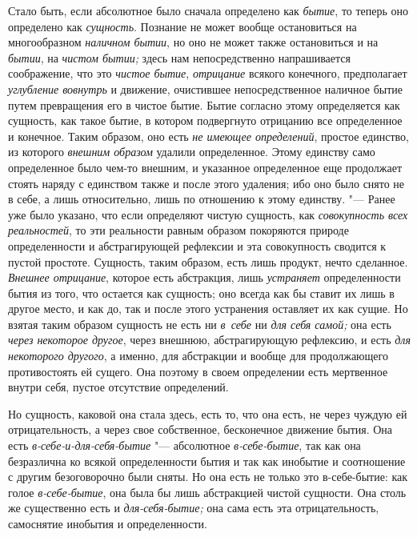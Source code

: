 Стало быть, если абсолютное было сначала определено как
{\em бытие}, то теперь оно определено как
{\em сущность}. Познание не может вообще остановиться
на многообразном {\em наличном бытии}, но оно не может
также остановиться и на {\em бытии}, на
{\em чистом бытии;} здесь нам непосредственно
напрашивается соображение, что это {\em чистое бытие},
{\em отрицание} всякого конечного, предполагает
{\em углубление вовнутрь} и движение, очистившее
непосредственное наличное бытие путем превращения его в чистое бытие. Бытие
согласно этому определяется как сущность, как такое бытие, в котором
подвергнуто отрицанию все определенное и конечное. Таким образом, оно есть
{\em не имеющее определений}, простое единство, из
которого {\em внешним образом} удалили определенное.
Этому единству само определенное было чем-то внешним, и указанное
определенное еще продолжает стоять наряду с единством также и после этого
удаления; ибо оно было снято не в себе, а лишь относительно, лишь по
отношению к этому единству. "--- Ранее
уже было указано, что если определяют чистую сущность, как
{\em совокупность всех реальностей}, то эти реальности
равным образом покоряются природе определенности и абстрагирующей рефлексии
и эта совокупность сводится к пустой простоте. Сущность, таким образом,
есть лишь продукт, нечто сделанное. {\em Внешнее
отрицание}, которое есть абстракция, лишь
{\em устраняет} определенности бытия из того, что
остается как сущность; оно
всегда как бы ставит их лишь в другое место, и как до, так и после этого
устранения оставляет их как сущие. Но взятая таким образом сущность не есть
ни {\em в~себе} ни {\em для себя самой;} она есть {\em через некоторое другое},
через внешнюю, абстрагирующую рефлексию, и есть {\em для
некоторого другого}, а именно, для абстракции и вообще для продолжающего
противостоять ей сущего. Она поэтому в своем определении есть мертвенное
внутри себя, пустое отсутствие определений.

Но сущность, каковой она стала здесь, есть то, что она есть, не через чуждую
ей отрицательность, а через свое собственное, бесконечное движение бытия.
Она есть {\em в-себе-и-для-себя-бытие} "--- абсолютное
{\em в-себе-бытие}, так как она безразлична ко всякой
определенности бытия и так как инобытие и соотношение с другим
безоговорочно были сняты. Но она есть не только это в-себе-бытие: как голое
{\em в-себе-бытие}, она была бы лишь абстракцией чистой
сущности. Она столь же существенно есть и
{\em для-себя-бытие;} она сама есть эта
отрицательность, самоснятие инобытия и определенности.

